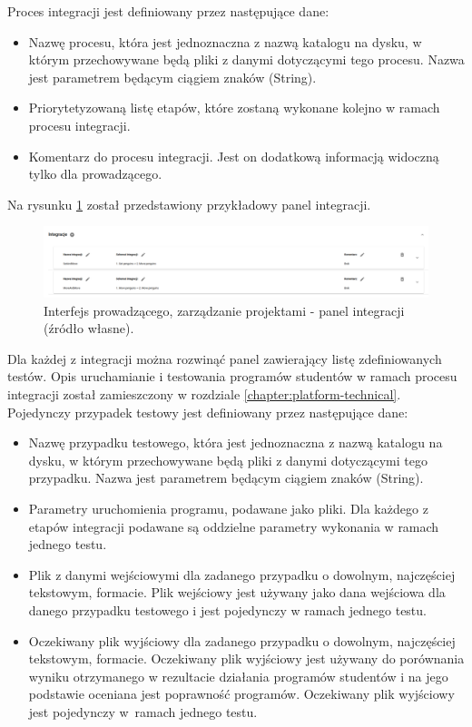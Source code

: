 Proces integracji jest definiowany przez następujące dane:
\begin {itemize}
    \item Nazwę procesu, która jest jednoznaczna z nazwą katalogu na dysku, w którym przechowywane będą pliki z danymi dotyczącymi tego procesu.
    Nazwa jest parametrem będącym ciągiem znaków (String).
    \item Priorytetyzowaną listę etapów, które zostaną wykonane kolejno w ramach procesu integracji.
    \item Komentarz do procesu integracji.
    Jest on dodatkową informacją widoczną tylko dla prowadzącego.
\end {itemize}

Na rysunku \ref{fig:lecturer_integrations} został przedstawiony przykładowy panel integracji.

\begin{figure}[h]
    \centering
    \includegraphics[width = 15cm]{chapter04/lecturer_integrations.png}
    \caption{Interfejs prowadzącego, zarządzanie projektami - panel integracji (źródło własne).}
    \label{fig:lecturer_integrations}
\end{figure}

Dla każdej z integracji można rozwinąć panel zawierający listę zdefiniowanych testów.
Opis uruchamianie i testowania programów studentów w ramach procesu integracji został zamieszczony w rozdziale \ref{chapter:platform-technical}.
Pojedynczy przypadek testowy jest definiowany przez następujące dane:
\begin {itemize}
    \item Nazwę przypadku testowego, która jest jednoznaczna z nazwą katalogu na dysku, w którym przechowywane będą pliki z danymi dotyczącymi tego przypadku.
    Nazwa jest parametrem będącym ciągiem znaków (String).
    \item Parametry uruchomienia programu, podawane jako pliki.
    Dla każdego z etapów integracji podawane są oddzielne parametry wykonania w ramach jednego testu.
    \item Plik z danymi wejściowymi dla zadanego przypadku o dowolnym, najczęściej tekstowym, formacie.
    Plik wejściowy jest używany jako dana wejściowa dla danego przypadku testowego i jest pojedynczy w ramach jednego testu.
    \item Oczekiwany plik wyjściowy dla zadanego przypadku o dowolnym, najczęściej tekstowym, formacie.
    Oczekiwany plik wyjściowy jest używany do porównania wyniku otrzymanego w rezultacie działania programów studentów i na jego podstawie oceniana jest poprawność programów.
    Oczekiwany plik wyjściowy jest pojedynczy w~ramach jednego testu.
\end {itemize}

